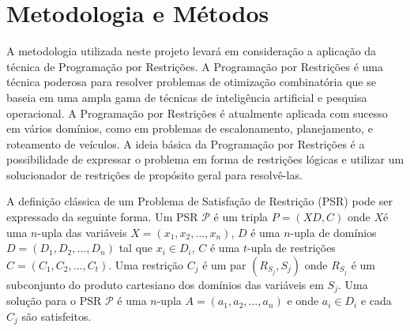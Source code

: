 


\section{Metodologia e Métodos}

A metodologia utilizada neste projeto levará em consideração a aplicação da técnica de Programação por Restrições. A Programação por Restrições é uma técnica poderosa para resolver problemas de otimização combinatória que se baseia em uma ampla gama de técnicas de inteligência artificial e pesquisa operacional. A Programação por Restrições é atualmente aplicada com sucesso em vários domínios, como em problemas de escalonamento, planejamento, e roteamento de veículos. A ideia básica da Programação por Restrições é a possibilidade de expressar o problema em forma de restrições lógicas e utilizar um solucionador de restrições de propósito geral para resolvê-las.


A definição clássica de um Problema de Satisfação de Restrição (PSR) pode ser expressado da seguinte forma. Um PSR $\mathcal{P}$ é um tripla $P = (X D, C)$ onde $X $é uma $n$-upla das variáveis $X = (x_1, x_2, ..., x_n)$, $D$ é uma $n$-upla de domínios $D = (D_1, D_2, ..., D_n)$ tal que $x_i \in D_i$, $C$ é uma $t$-upla de restrições $C = (C_1, C_2,. . . , C_t)$. Uma restrição $C_j$ é um par $(R_{S_j}, S_j)$ onde $R_{S_j}$ é um subconjunto do produto cartesiano dos domínios das variáveis em $S_j$. Uma solução para o PSR $\mathcal{P}$ é uma $n$-upla $A = (a_1, a_2, ...,a_n)$ e onde $a_i \in D_i$ e cada $C_j$ são satisfeitos.


